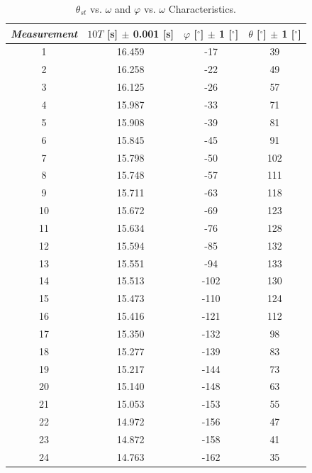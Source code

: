\documentclass{article}
\begin{document}
\begin{table}[!h]
\begin{center}
\begin{tabular}{|c|c|c|c|}
\hline
\textit{Measurement} & $10T$ [s] $\pm$ 0.001 [s] &
$\varphi$ [$^\circ$] $\pm$ 1 [$^\circ$] & $\theta$ [$^\circ$] $\pm$ 1 [$^\circ$]
\\
\hline
1	&	16.459	&	-17		&	39\\
2	&	16.258	&	-22		&	49\\
3	&	16.125	&	-26		&	57\\
4	&	15.987	&	-33		&	71\\
5	&	15.908	&	-39		&	81\\
6	&	15.845	&	-45		&	91\\
7	&	15.798	&	-50		&	102\\
8	&	15.748	&	-57		&	111\\
9	&	15.711	&	-63		&	118\\
10	&	15.672	&	-69		&	123\\
11	&	15.634	&	-76		&	128\\
12	&	15.594	&	-85		&	132\\
13	&	15.551	&	-94		&	133\\
14	&	15.513	&	-102	&	130\\
15	&	15.473	&	-110	&	124\\
16	&	15.416	&	-121	&	112\\
17	&	15.350	&	-132	&	98\\
18	&	15.277	&	-139	&	83\\
19	&	15.217	&	-144	&	73\\
20	&	15.140	&	-148	&	63\\
21	&	15.053	&	-153	&	55\\
22	&	14.972	&	-156	&	47\\
23	&	14.872	&	-158	&	41\\
24	&	14.763	&	-162	&	35\\
\hline
\end{tabular}
\caption{$ \theta_{st} $ vs. $ \omega $ and $ \varphi $ vs. $ \omega $ Characteristics.}
\label{tab-5}
\end{center}
\end{table}
\end{document}
